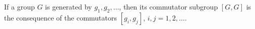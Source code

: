 If a group $G$ is generated by $g_1, g_2, \ldots$, then its commutator subgroup $[G,G]$ is the consequence of the commutators $[g_i, g_j]$, $i, j = 1, 2, \ldots$.
